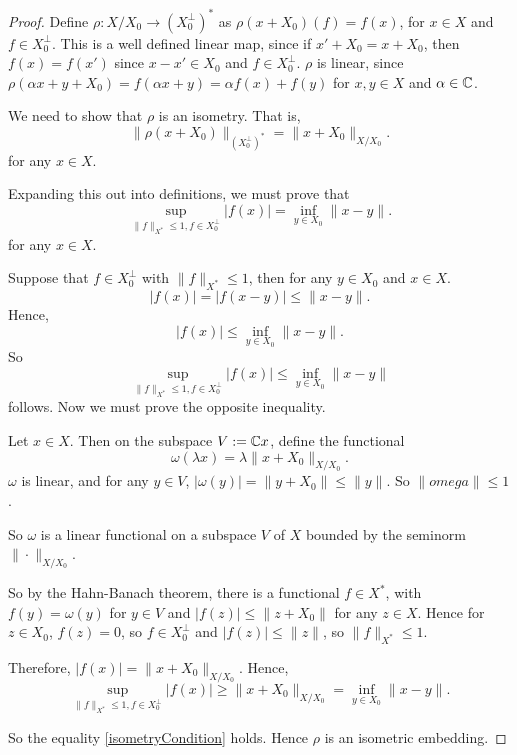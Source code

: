 \documentclass{unswmaths}
\begin{document}
\begin{proof}
    Define $\rho:X/X_0\rightarrow (X_0^\perp)^*$ as $\rho(x+X_0)(f) = f(x)$, for $x \in X$
    and $f \in X_0^\perp$. This is a well defined linear map, since if $x' + X_0 = x+X_0$, then 
    $f(x) = f(x')$ since $x-x' \in X_0$ and $f \in X_0^\perp$. $\rho$ is linear, since $\rho(\alpha x+y+X_0) = f(\alpha x+y) = \alpha f(x) + f(y)$
    for $x,y \in X$ and $\alpha \in \mathbb{C}$.
    
    
    We need to show that $\rho$ is an isometry. That is,
    \begin{equation*}
        \| \rho(x+X_0)\|_{(X_0^\perp)^*} = \| x+X_0\|_{X/X_0}.
    \end{equation*}
    for any $x \in X$.
    
    Expanding this out into definitions, we must prove that
    \begin{equation}
    \label{isometryCondition}
        \sup_{\|f\|_{X^*} \leq 1, f \in X_0^\perp} |f(x)| = \inf_{y \in X_0} \|x-y\|.
    \end{equation}
    for any $x \in X$.
    
    Suppose that $f \in X_0^\perp$ with $\|f\|_{X^*} \leq 1$, then for any $y \in X_0$
    and $x \in X$.
    \begin{equation*}
        |f(x)| = |f(x-y)| \leq \|x-y\|.
    \end{equation*}
    Hence,
    \begin{equation*}
        |f(x)| \leq \inf_{y \in X_0} \|x-y\|.
    \end{equation*}
    So
    \begin{equation*}
        \sup_{\|f\|_{X^*} \leq 1, f \in X_0^\perp} |f(x)| \leq \inf_{y \in X_0} \|x-y\|
    \end{equation*}
    follows. Now we must prove the opposite inequality. 
    
    Let $x \in X$. Then on the subspace $V := \mathbb{C} x$, define the functional
    \begin{equation*}
        \omega(\lambda x) = \lambda \|x+X_0\|_{X/X_0}.
    \end{equation*}
    $\omega$ is linear, and for any $y \in V$, $|\omega(y)| = \|y+X_0\| \leq \|y\|$.  So $\|omega\| \leq 1$.
    
    So $\omega$ is a linear functional on a subspace $V$ of $X$ bounded by the seminorm $\|\cdot\|_{X/X_0}$. 
    
    So by the Hahn-Banach theorem, there is a functional $f \in X^*$, with $f(y) = \omega(y)$ for $y \in V$
    and $|f(z)| \leq \|z+X_0\|$ for any $z \in X$. Hence for $z \in X_0$, $f(z) = 0$, so $f \in X_0^\perp$
    and $|f(z)|\leq \|z\|$, so $\|f\|_{X^*}\leq 1$. 
    
    Therefore, $|f(x)| = \|x+X_0\|_{X/X_0}$. Hence, 
    \begin{equation*}
        \sup_{\|f\|_{X^*} \leq 1, f \in X_0^\perp} |f(x)| \geq \|x+X_0\|_{X/X_0} =  \inf_{y \in X_0} \|x-y\|.
    \end{equation*}
    
    So the equality \ref{isometryCondition} holds. Hence $\rho$ is an isometric embedding.    
\end{proof}
\end{document}
